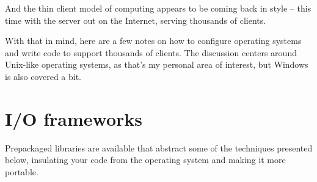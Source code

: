 \documentclass[12pt, twoside, a4paper, xetex]{report}
\begin{document}
And the thin client model of computing appears to be coming back in style -- this time with the server out on the Internet, serving thousands of clients.

With that in mind, here are a few notes on how to configure operating systems and write code to support thousands of clients. The discussion centers around Unix-like operating systems, as that's my personal area of interest, but Windows is also covered a bit.

\section*{I/O frameworks}

Prepackaged libraries are available that abstract some of the techniques presented below, insulating your code from the operating system and making it more portable.
	
\end{document}

